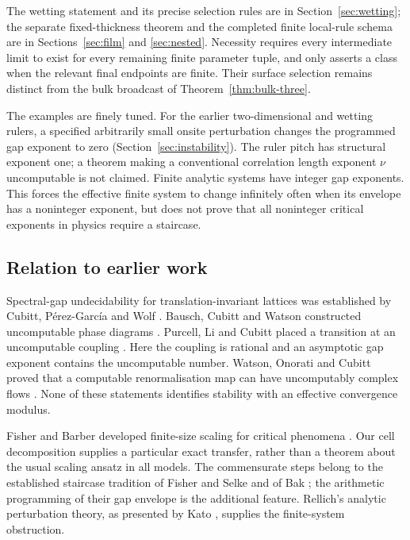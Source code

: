 The wetting statement and its precise selection rules are in
Section~\ref{sec:wetting}; the separate fixed-thickness theorem and the
completed finite local-rule schema are in Sections~\ref{sec:film} and
\ref{sec:nested}. Necessity requires every intermediate limit to exist
for every remaining finite parameter tuple, and only asserts a class
when the relevant final endpoints are finite. Their surface selection remains distinct from the bulk broadcast
of Theorem~\ref{thm:bulk-three}.

The examples are finely tuned. For the earlier two-dimensional and
wetting rulers, a specified arbitrarily small onsite perturbation
changes the programmed gap exponent to zero
(Section~\ref{sec:instability}). The ruler pitch has
structural exponent one; a theorem making a conventional correlation
length exponent $\nu$ uncomputable is not claimed. Finite analytic
systems have integer gap exponents. This forces the effective finite
system to change infinitely often when its envelope has a noninteger
exponent, but does not prove that all noninteger critical exponents in
physics require a staircase.

\subsection{Relation to earlier work}
Spectral-gap undecidability for translation-invariant lattices was
established by Cubitt, P\'erez-Garc\'ia and Wolf
\cite{spectralShort,spectralFull}. Bausch, Cubitt and Watson constructed
uncomputable phase diagrams \cite{phaseDiagrams}. Purcell, Li and Cubitt
placed a transition at an uncomputable coupling \cite{chaitinTransition}.
Here the coupling is rational and an asymptotic gap exponent contains
the uncomputable number. Watson, Onorati and Cubitt proved that a
computable renormalisation map can have uncomputably complex flows
\cite{renormalisation}. None of these statements identifies stability
with an effective convergence modulus.

Fisher and Barber developed finite-size scaling for critical phenomena
\cite{fisherBarber}. Our cell decomposition supplies a particular exact
transfer, rather than a theorem about the usual scaling ansatz in all
models. The commensurate steps belong to the established staircase
tradition of Fisher and Selke and of Bak \cite{fisherSelke,bak}; the
arithmetic programming of their gap envelope is the additional feature.
Rellich's analytic perturbation theory, as presented by Kato
\cite{kato}, supplies the finite-system obstruction.

